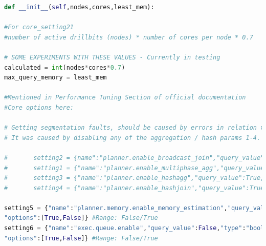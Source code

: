 \documentclass[a4paper,english]{report}
\begin{document}
\begin{lstlisting}[language=Python, caption=class\_definition.py\, the file defining all the algorithmic operations done during a optimization process.]
def __init__(self,nodes,cores,least_mem):

#For core_setting21
#number of active drillbits (nodes) * number of cores per node * 0.7

# SOME EXPERIMENTS WITH THESE VALUES - Currently in testing 
calculated = int(nodes*cores*0.7)
max_query_memory = least_mem

#Mentioned in Performance Tuning Section of official documentation
#Core options here:

# Getting segmentation faults, should be caused by errors in relation to memory.
# It was caused by disabling any of the aggregation / hash params 1-4. Options diabled.

#		setting2 = {name":"planner.enable_broadcast_join","query_value":True,"type":"boolean","options":[True,False]} #Range: False/True
#		setting1 = {"name":"planner.enable_multiphase_agg","query_value":True,"type":"boolean","options":[True,False]} #Range: False/True
#		setting3 = {"name":"planner.enable_hashagg","query_value":True,"type":"boolean","options":[True,False]} #Range: False/True
#		setting4 = {"name":"planner.enable_hashjoin","query_value":True,"type":"boolean","options":[True,False]}	#Range: False/True

setting5 = {"name":"planner.memory.enable_memory_estimation","query_value":False,"type":"boolean",
"options":[True,False]} #Range: False/True
setting6 = {"name":"exec.queue.enable","query_value":False,"type":"boolean",
"options":[True,False]} #Range: False/True


\end{lstlisting}
\end{document}
